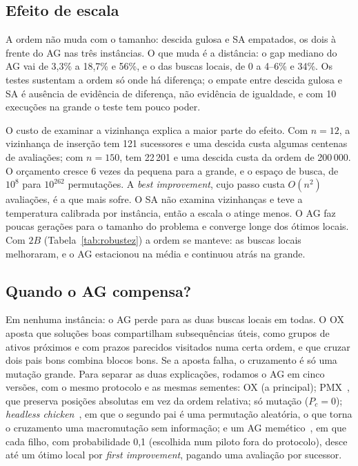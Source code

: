 \subsection{Efeito de escala}

A ordem não muda com o tamanho: descida gulosa e SA empatados, os dois à frente do AG nas três instâncias.
O que muda é a distância: o gap mediano do AG vai de 3,3\% a 18,7\% e 56\%, e o das buscas locais, de 0 a 4--6\% e 34\%.
Os testes sustentam a ordem só onde há diferença; o empate entre descida gulosa e SA é ausência de evidência de diferença, não evidência de igualdade, e com 10 execuções na grande o teste tem pouco poder.

O custo de examinar a vizinhança explica a maior parte do efeito.
Com $n = 12$, a vizinhança de inserção tem 121 sucessores e uma descida custa algumas centenas de avaliações; com $n = 150$, tem 22\,201 e uma descida custa da ordem de 200\,000.
O orçamento cresce 6 vezes da pequena para a grande, e o espaço de busca, de $10^{8}$ para $10^{262}$ permutações.
A \textit{best improvement}, cujo passo custa $O(n^2)$ avaliações, é a que mais sofre.
O SA não examina vizinhanças e teve a temperatura calibrada por instância, então a escala o atinge menos.
O AG faz poucas gerações para o tamanho do problema e converge longe dos ótimos locais.
Com $2B$ (Tabela~\ref{tab:robustez}) a ordem se manteve: as buscas locais melhoraram, e o AG estacionou na média e continuou atrás na grande.

\subsection{Quando o AG compensa?}

Em nenhuma instância: o AG perde para as duas buscas locais em todas.
O OX aposta que soluções boas compartilham subsequências úteis, como grupos de ativos próximos e com prazos parecidos visitados numa certa ordem, e que cruzar dois pais bons combina blocos bons.
Se a aposta falha, o cruzamento é só uma mutação grande.
Para separar as duas explicações, rodamos o AG em cinco versões, com o mesmo protocolo e as mesmas sementes:
OX (a principal);
PMX~\citep{goldberg1985alleles}, que preserva posições absolutas em vez da ordem relativa;
só mutação ($P_c = 0$);
\textit{headless chicken}~\citep{jones1995crossover}, em que o segundo pai é uma permutação aleatória, o que torna o cruzamento uma macromutação sem informação;
e um AG memético~\citep{moscato1989memetic}, em que cada filho, com probabilidade 0,1 (escolhida num piloto fora do protocolo), desce até um ótimo local por \textit{first improvement}, pagando uma avaliação por sucessor.

